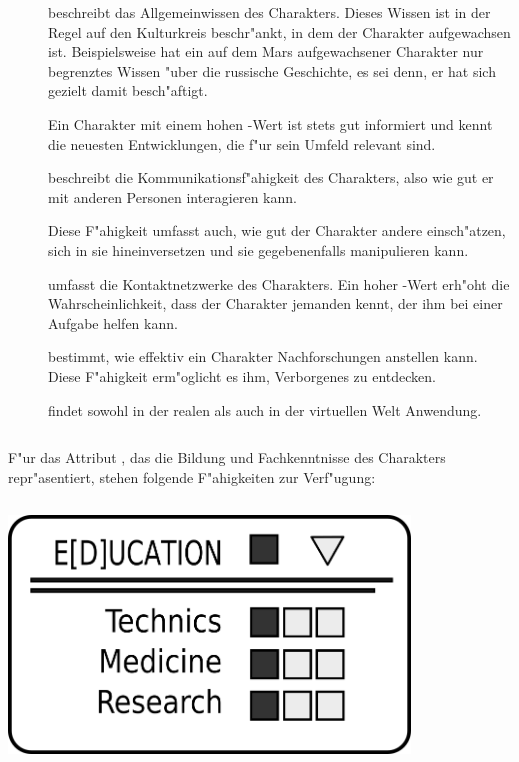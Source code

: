 \begin{description}
    \item[]  beschreibt das Allgemeinwissen des Charakters. Dieses Wissen ist in der Regel auf den 
        Kulturkreis beschr"ankt, in dem der Charakter aufgewachsen ist. Beispielsweise hat ein auf dem Mars aufgewachsener Charakter nur begrenztes Wissen "uber die russische Geschichte, es sei denn, er hat sich gezielt damit besch"aftigt.

        Ein Charakter mit einem hohen -Wert ist stets gut informiert und kennt die neuesten Entwicklungen, die f"ur sein Umfeld relevant sind.
    \item[]  beschreibt die Kommunikationsf"ahigkeit des Charakters, also wie gut er mit anderen 
        Personen interagieren kann.

        Diese F"ahigkeit umfasst auch, wie gut der Charakter andere einsch"atzen, sich in sie hineinversetzen und sie gegebenenfalls manipulieren kann.

         umfasst die Kontaktnetzwerke des Charakters. Ein hoher -Wert erh"oht die Wahrscheinlichkeit, dass der Charakter jemanden kennt, der ihm bei einer Aufgabe helfen kann.
    \item[]  bestimmt, wie effektiv ein Charakter Nachforschungen anstellen kann. Diese F"ahigkeit 
        erm"oglicht es ihm, Verborgenes zu entdecken.

         findet sowohl in der realen als auch in der virtuellen Welt Anwendung.
\end{description}

\medskip
\begin{column}[l]{0.55}
    F"ur das Attribut , das die Bildung und Fachkenntnisse des Charakters repr"asentiert, stehen folgende F"ahigkeiten zur Verf"ugung:

\end{column}
\begin{column}[r]{0.45}
    \centering
    \includegraphics[width=0.80\textwidth]{images/character_education.png}
\end{column}


